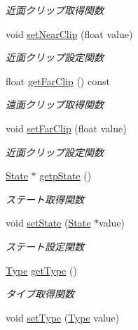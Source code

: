 \begin{DoxyCompactItemize}
\begin{DoxyCompactList}\small\item\em 近面クリップ取得関数 \end{DoxyCompactList}\item 
void \mbox{\hyperlink{class_camera_a911ec8ed518a107fec11766b97d6d025}{set\+Near\+Clip}} (float value)
\begin{DoxyCompactList}\small\item\em 近面クリップ設定関数 \end{DoxyCompactList}\item 
float \mbox{\hyperlink{class_camera_a0c7ba904973245fcd1b7e825eaa8d9ba}{get\+Far\+Clip}} () const
\begin{DoxyCompactList}\small\item\em 遠面クリップ取得関数 \end{DoxyCompactList}\item 
void \mbox{\hyperlink{class_camera_a1afa6c327f1f7d273c79acd55501c4ad}{set\+Far\+Clip}} (float value)
\begin{DoxyCompactList}\small\item\em 近面クリップ設定関数 \end{DoxyCompactList}\item 
\mbox{\hyperlink{class_camera_1_1_state}{State}} $\ast$ \mbox{\hyperlink{class_camera_af6c2d92a8119d8379ee8f421a04e1a0c}{getp\+State}} ()
\begin{DoxyCompactList}\small\item\em ステート取得関数 \end{DoxyCompactList}\item 
void \mbox{\hyperlink{class_camera_aedfc18fafa8a97eafbd8a2cb24c2e41b}{set\+State}} (\mbox{\hyperlink{class_camera_1_1_state}{State}} $\ast$value)
\begin{DoxyCompactList}\small\item\em ステート設定関数 \end{DoxyCompactList}\item 
\mbox{\hyperlink{class_camera_a3b0a1f58deca679ac665f61c480d1dcb}{Type}} \mbox{\hyperlink{class_camera_a65143452b51a6d5e1470f79a4c358679}{get\+Type}} ()
\begin{DoxyCompactList}\small\item\em タイプ取得関数 \end{DoxyCompactList}\item 
void \mbox{\hyperlink{class_camera_a93ecfb5163ef828fb6a5e2238954685e}{set\+Type}} (\mbox{\hyperlink{class_camera_a3b0a1f58deca679ac665f61c480d1dcb}{Type}} value)

\end{DoxyCompactItemize}
